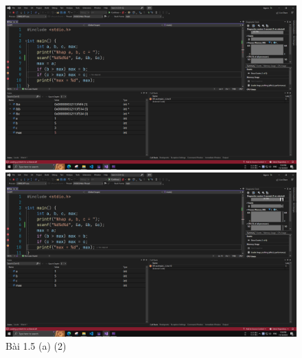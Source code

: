 \documentclass[a4paper, 12pt, notitlepage]{article}
\begin{document}
	\begin{figure}[h]
		\begin{center}
			\includegraphics[scale=0.28]{Screenshot (1361).png}
		\end{center}
		\begin{center}
			\includegraphics[scale=0.28]{Screenshot (1362).png}
		\end{center}
		\caption{Bài 1.5 (a) (2)}
	\end{figure}
\end{document}
